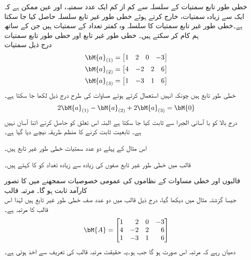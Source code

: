 خطی طور تابع سمتیات کے سلسلہ سے کم از کم ایک عدد سمتیہ، اور عین ممکن ہے کہ ایک سے زیادہ سمتیات، خارج کرتے ہوئے خطی طور غیر تابع سلسلہ حاصل کیا جا سکتا ہے۔خطی طور غیر تابع سمتیات کا سلسلہ وہ کمتر تعداد کے سمتیات ہیں جن کے ساتھ ہم کام کر سکتے ہیں۔
\quad خطی طور غیر تابع اور خطی طور تابع سمتیات\\
درج ذیل سمتیات 
\begin{align*}
\bM{a}_{(1)}&=\begin{bmatrix*}[r] 1&2&0&-3  \end{bmatrix*}\\
\bM{a}_{(2)}&=\begin{bmatrix*}[r] 4&-2&2&6  \end{bmatrix*}\\
\bM{a}_{(3)}&=\begin{bmatrix*}[r] 1&-3&1&6  \end{bmatrix*}
\end{align*}
خطی طور تابع ہیں چونکہ انہیں استعمال کرتے ہوئے مساوات  کی طرح  درج ذیل لکھا جا سکتا ہے۔
\begin{align*}
2\bM{a}_{(1)}-\bM{a}_{(2)}+2\bM{a}_{(3)}=\bM{0}
\end{align*}
درج بالا کو با آسانی الجبرا سے ثابت کیا جا سکتا ہے البتہ اس تعلق کو حاصل کرنے اتنا آسان نہیں ہے۔ تابعیت ثابت کرنے کا منظم طریقہ نیچے دیا گیا ہے۔ 

اس مثال کے پہلے دو عدد سمتیات خطی طور غیر تابع ہیں۔

قالب  میں خطی طور غیر تابع صفوں کی زیادہ سے زیادہ تعداد  کو  کا  کہتے ہیں۔ 

قالبوں  اور خطی مساوات کے نظاموں کی عمومی خصوصیات سمجھنے  میں  کا تصور  کارآمد ثابت ہو گا۔ 
\quad مرتبہ قالب\\
جیسا گزشتہ مثال میں دیکھا گیا، درج ذیل قالب میں دو عدد صف خطی طور غیر تابع ہیں لہٰذا اس قالب  کا مرتبہ  ہے۔
\begin{align*}
\bM{A}=\begin{bmatrix*}[r] 1&2&0&-3\\4&-2&2&6\\1&-3&1&6 \end{bmatrix*}
\end{align*}
دھیان رہے کہ مرتبہ  اس صورت  ہو گا جب  ہو۔یہ حقیقت مرتبہ قالب کی تعریف سے اخذ ہوتی ہے۔ 

